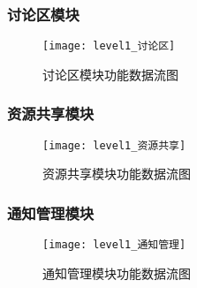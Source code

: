 \subsubsection{讨论区模块}
\begin{figure}[H]
\centering
\texttt{[image: level1\_讨论区]}
\caption{讨论区模块功能数据流图}
\end{figure}
\subsubsection{资源共享模块}
\begin{figure}[H]
\centering
\texttt{[image: level1\_资源共享]}
\caption{资源共享模块功能数据流图}
\end{figure}
\subsubsection{通知管理模块}
\begin{figure}[H]
\centering
\texttt{[image: level1\_通知管理]}
\caption{通知管理模块功能数据流图}
\end{figure}
